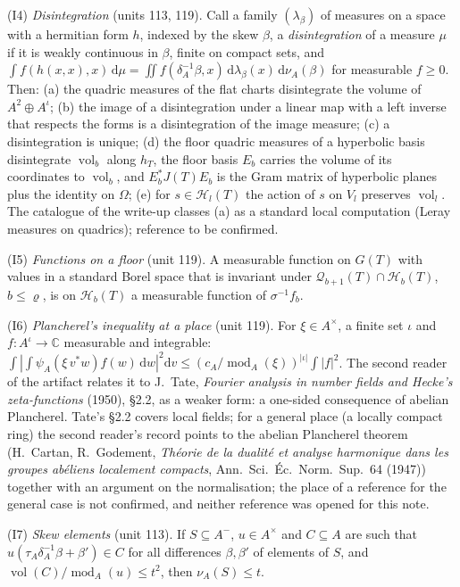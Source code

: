 \documentclass[11pt,a4paper]{article}
\theoremstyle{plainx}
\theoremstyle{uprightx}
\newcommand{\CC}{\mathbb{C}}
\newcommand{\dd}{\mathrm{d}}
\newcommand{\GT}[1]{G(#1)}
\newcommand{\JT}[1]{J(#1)}
\newcommand{\Hl}[2]{\mathcal{H}_{#1}(#2)}
\newcommand{\Ql}[2]{\mathcal{Q}_{#1}(#2)}
\newcommand{\modA}{\operatorname{mod}_A}
\newcommand{\vol}{\operatorname{vol}}
\newcommand{\Inp}[1]{\textup{(#1)}}
\begin{document}
\Inp{I4} \emph{Disintegration} (units 113, 119). Call a family $(\lambda_\beta)$ of measures on a space with a
hermitian form $h$, indexed by the skew $\beta$, a \emph{disintegration} of a measure $\mu$ if it is weakly
continuous in $\beta$, finite on compact sets, and
$\int f(h(x,x),x)\,\dd\mu=\iint f(\delta_A^{-1}\beta,x)\,\dd\lambda_\beta(x)\,\dd\nu_A(\beta)$ for measurable $f\ge0$.
Then: (a) the quadric measures of the flat charts disintegrate the volume of $A^2\oplus A^{\iota}$; (b) the image of
a disintegration under a linear map with a left inverse that respects the forms is a disintegration of the image
measure; (c) a disintegration is unique; (d) the floor quadric measures of a hyperbolic basis disintegrate $\vol_b$
along $h_T$, the floor basis $E_b$ carries the volume of its coordinates to $\vol_b$, and $E_b^{*}\JT{T}E_b$ is the
Gram matrix of hyperbolic planes plus the identity on $\Omega$; (e) for $s\in\Hl{l}{T}$ the action of $s$ on $V_l$
preserves $\vol_l$. The catalogue of the write-up classes (a) as a standard local computation (Leray measures on
quadrics); reference to be confirmed.

\Inp{I5} \emph{Functions on a floor} (unit 119). A measurable function on $\GT{T}$ with values in a standard Borel
space that is invariant under $\Ql{b+1}{T}\cap\Hl{b}{T}$, $b\le\varrho$, is on $\Hl{b}{T}$ a measurable function of
$\sigma^{-1}f_b$.

\Inp{I6} \emph{Plancherel's inequality at a place} (unit 119). For $\xi\in A^{\times}$, a finite set $\iota$ and
$f\colon A^{\iota}\to\CC$ measurable and integrable:
$\int|\int\psi_A(\xi\,v^{*}w)f(w)\,\dd w|^2\dd v\le(c_A/\modA(\xi))^{|\iota|}\int|f|^2$. The second reader of the
artifact relates it to J.~Tate, \emph{Fourier analysis in number fields and Hecke's zeta-functions} (1950), \S2.2, as
a weaker form: a one-sided consequence of abelian Plancherel. Tate's \S2.2 covers local fields; for a general place
(a locally compact ring) the second reader's record points to the abelian Plancherel theorem (H.~Cartan,
R.~Godement, \emph{Th\'eorie de la dualit\'e et analyse harmonique dans les groupes ab\'eliens localement compacts},
Ann.\ Sci.\ \'Ec.\ Norm.\ Sup.\ 64 (1947)) together with an argument on the normalisation; the place of a reference
for the general case is not confirmed, and neither reference was opened for this note.

\Inp{I7} \emph{Skew elements} (unit 113). If $S\subseteq A^{-}$, $u\in A^{\times}$ and $C\subseteq A$ are such that
$u(\tau_A\delta_A^{-1}\beta+\beta')\in C$ for all differences $\beta,\beta'$ of elements of $S$, and
$\vol(C)/\modA(u)\le t^2$, then $\nu_A(S)\le t$.
\end{document}
